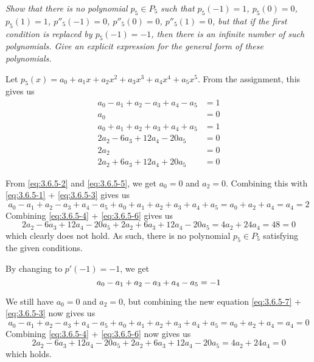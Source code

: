 \textit{Show that there is no polynomial $p_5 \in P_5$ such that $p_5(-1) = 1$, $p_5(0) = 0$, $p_5(1) = 1$, $p''_5(-1) = 0$, $p''_5(0) = 0$, $p''_5(1) = 0$, but that if the first condition is replaced by $p_5(-1) = -1$, then there is an infinite number of such polynomials. Give an explicit expression for the general form of these polynomials.}

Let $p_5(x) = a_0 + a_1 x + a_2 x^2 + a_3 x^3 + a_4 x^4 + a_5 x^5$. From the assignment, this gives us
\begin{align}
\label{eq:3.6.5-1}
    a_0 - a_1 + a_2 - a_3 + a_4 - a_5 &= 1 \\
\label{eq:3.6.5-2}
    a_0 &= 0 \\
\label{eq:3.6.5-3}
    a_0 + a_1 + a_2 + a_3 + a_4 + a_5 &= 1 \\
\label{eq:3.6.5-4}
    2a_2 - 6a_3 + 12a_4 - 20a_5 &= 0 \\
\label{eq:3.6.5-5}
    2a_2 &= 0 \\
\label{eq:3.6.5-6}
    2a_2 + 6a_3 + 12a_4 + 20a_5 &= 0
\end{align}

From \eqref{eq:3.6.5-2} and \eqref{eq:3.6.5-5}, we get $a_0 = 0$ and $a_2 = 0$. Combining this with \eqref{eq:3.6.5-1} + \eqref{eq:3.6.5-3} gives us
\begin{equation*}
    a_0 - a_1 + a_2 - a_3 + a_4 - a_5 + a_0 + a_1 + a_2 + a_3 + a_4 + a_5 = a_0 + a_2 + a_4 = a_4 = 2
\end{equation*}
Combining \eqref{eq:3.6.5-4} + \eqref{eq:3.6.5-6} gives us 
\begin{equation*}
    2a_2 - 6a_3 + 12a_4 - 20a_5 + 2a_2 + 6a_3 + 12a_4 - 20a_5 = 4a_2 + 24a_4 = 48 = 0
\end{equation*}
which clearly does not hold. As such, there is no polynomial $p_5 \in P_5$ satisfying the given conditions.

By changing to $p'(-1) = -1$, we get 
\begin{equation}
\label{eq:3.6.5-7}
    a_0 - a_1 + a_2 - a_3 + a_4 - a_5 = -1 \\
\end{equation}

We still have $a_0 = 0$ and $a_2 = 0$, but combining the new equation \eqref{eq:3.6.5-7} + \eqref{eq:3.6.5-3} now gives us
\begin{equation*}
    a_0 - a_1 + a_2 - a_3 + a_4 - a_5 + a_0 + a_1 + a_2 + a_3 + a_4 + a_5 = a_0 + a_2 + a_4 = a_4 = 0
\end{equation*}
Combining \eqref{eq:3.6.5-4} + \eqref{eq:3.6.5-6} now gives us 
\begin{equation*}
    2a_2 - 6a_3 + 12a_4 - 20a_5 + 2a_2 + 6a_3 + 12a_4 - 20a_5 = 4a_2 + 24a_4 = 0
\end{equation*}
which holds.

